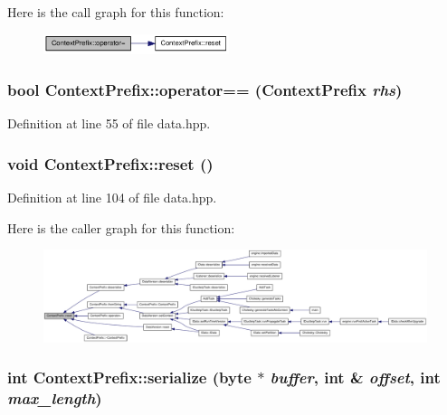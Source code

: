 Here is the call graph for this function:\nopagebreak
\begin{figure}[H]
\begin{center}
\leavevmode
\includegraphics[width=154pt]{struct_context_prefix_aeab1c6d784c133599e95d7bf10fdfff6_cgraph}
\end{center}
\end{figure}
\hypertarget{struct_context_prefix_a8bc65e87aaf036594bd0d5a14da4402e}{
\subsubsection[{operator==}]{\setlength{\rightskip}{0pt plus 5cm}bool ContextPrefix::operator== ({\bf ContextPrefix} {\em rhs})}}
\label{struct_context_prefix_a8bc65e87aaf036594bd0d5a14da4402e}


Definition at line 55 of file data.hpp.\hypertarget{struct_context_prefix_af68366f850532d0a204ba1cbabc403cb}{
\subsubsection[{reset}]{\setlength{\rightskip}{0pt plus 5cm}void ContextPrefix::reset ()}}
\label{struct_context_prefix_af68366f850532d0a204ba1cbabc403cb}


Definition at line 104 of file data.hpp.

Here is the caller graph for this function:\nopagebreak
\begin{figure}[H]
\begin{center}
\leavevmode
\includegraphics[width=420pt]{struct_context_prefix_af68366f850532d0a204ba1cbabc403cb_icgraph}
\end{center}
\end{figure}
\hypertarget{struct_context_prefix_a324733817553bbc909f18acd01f697a6}{
\subsubsection[{serialize}]{\setlength{\rightskip}{0pt plus 5cm}int ContextPrefix::serialize ({\bf byte} $\ast$ {\em buffer}, \/  int \& {\em offset}, \/  int {\em max\_\-length})}}
\label{struct_context_prefix_a324733817553bbc909f18acd01f697a6}


